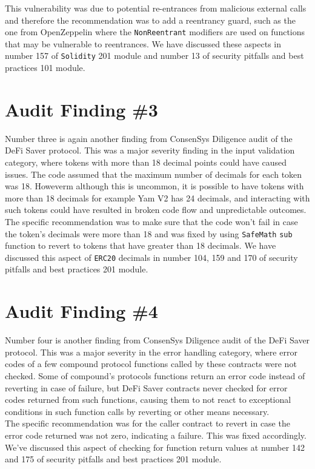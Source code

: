 This vulnerability was due to potential re-entrances from malicious external calls and therefore the recommendation was to add a reentrancy guard, such as the one from OpenZeppelin where the \verb|NonReentrant| modifiers are used on functions that may be vulnerable to reentrances. We have discussed these aspects in number 157 of \verb|Solidity| 201 module and number 13 of security pitfalls and best practices 101 module.

\section{Audit Finding \#3}

Number three is again another finding from ConsenSys Diligence audit of the DeFi Saver protocol. This was a major severity finding in the input validation category, where tokens with more than 18 decimal points could have caused issues. The code assumed that the maximum number of decimals for each token was 18. Howeverm although this is uncommon, it is possible to have tokens with more than 18 decimals for example Yam V2 has 24 decimals, and interacting with such tokens could have resulted in broken code flow and unpredictable outcomes.\\

The specific recommendation was to make sure that the code won't fail in case the token's decimals were more than 18 and was fixed by using \verb|SafeMath| \verb|sub| function to revert to tokens that have greater than 18 decimals. We have discussed this aspect of \verb|ERC20| decimals in number 104, 159 and 170 of security pitfalls and best practices 201 module.

\section{Audit Finding \#4}

Number four is another finding from ConsenSys Diligence audit of the DeFi Saver protocol. This was a major severity in the error handling category, where error codes of a few compound protocol functions called by these contracts were not checked. Some of compound's protocols functions return an error code instead of reverting in case of failure, but DeFi Saver contracts never checked for error codes returned from such functions, causing them to not react to exceptional conditions in such function calls by reverting or other means necessary.\\

The specific recommendation was for the caller contract to revert in case the error code returned was not zero, indicating a failure. This was fixed accordingly. We've discussed this aspect of checking for function return values at number 142 and 175 of security pitfalls and best practices 201 module.

